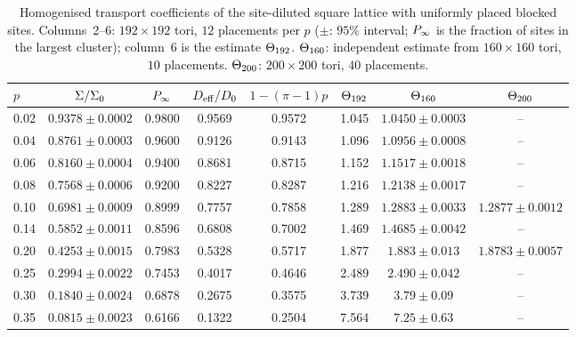 \begin{table}[tbp]
\centering\small
\caption{Homogenised transport coefficients of the site-diluted square lattice with uniformly placed blocked sites.
Columns~2--6: $192\times192$ tori, $12$ placements per $p$ ($\pm$: $95\%$ interval; $P_{\infty}$ is the fraction of sites
in the largest cluster); column~6 is the estimate $\Theta_{192}$. $\Theta_{160}$: independent estimate from
$160\times160$ tori, $10$ placements. $\Theta_{200}$: $200\times200$ tori, $40$ placements.}
\label{s7_defects_density:tab-homog}
\setlength{\tabcolsep}{4pt}
\begin{tabular}{@{}lccccccc@{}}
\toprule
$p$ & $\Sigma/\Sigma_{0}$ & $P_{\infty}$ & $D_{\mathrm{eff}}/D_{0}$ & $1-(\pi-1)p$ & $\Theta_{192}$ & $\Theta_{160}$ & $\Theta_{200}$ \\
\midrule
0.02 & $0.9378\pm0.0002$ & 0.9800 & 0.9569 & 0.9572 & 1.045 & $1.0450\pm0.0003$ & -- \\
0.04 & $0.8761\pm0.0003$ & 0.9600 & 0.9126 & 0.9143 & 1.096 & $1.0956\pm0.0008$ & -- \\
0.06 & $0.8160\pm0.0004$ & 0.9400 & 0.8681 & 0.8715 & 1.152 & $1.1517\pm0.0018$ & -- \\
0.08 & $0.7568\pm0.0006$ & 0.9200 & 0.8227 & 0.8287 & 1.216 & $1.2138\pm0.0017$ & -- \\
0.10 & $0.6981\pm0.0009$ & 0.8999 & 0.7757 & 0.7858 & 1.289 & $1.2883\pm0.0033$ & $1.2877\pm0.0012$ \\
0.14 & $0.5852\pm0.0011$ & 0.8596 & 0.6808 & 0.7002 & 1.469 & $1.4685\pm0.0042$ & -- \\
0.20 & $0.4253\pm0.0015$ & 0.7983 & 0.5328 & 0.5717 & 1.877 & $1.883\pm0.013$ & $1.8783\pm0.0057$ \\
0.25 & $0.2994\pm0.0022$ & 0.7453 & 0.4017 & 0.4646 & 2.489 & $2.490\pm0.042$ & -- \\
0.30 & $0.1840\pm0.0024$ & 0.6878 & 0.2675 & 0.3575 & 3.739 & $3.79\pm0.09$ & -- \\
0.35 & $0.0815\pm0.0023$ & 0.6166 & 0.1322 & 0.2504 & 7.564 & $7.25\pm0.63$ & -- \\
\bottomrule
\end{tabular}
\end{table}


